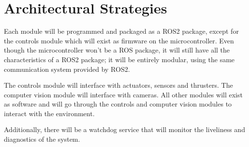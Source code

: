 \section{Architectural Strategies}
\label{sec:representation}

Each module will be programmed and packaged as a ROS2 package, except for the
controls module which will exist as firmware on the microcontroller. Even
though the microcontroller won’t be a ROS package, it will still have all the
characteristics of a ROS2 package; it will be entirely modular, using the same
communication system provided by ROS2. 
\par

The controls module will interface with actuators, sensors and thrusters. The
computer vision module will interface with cameras. All other modules will
exist as software and will go through the controls and computer vision modules
to interact with the environment. 
\par

Additionally, there will be a watchdog service that will monitor the liveliness
and diagnostics of the system.
\par

